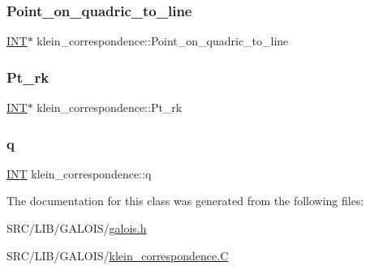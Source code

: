 \mbox{\label{classklein__correspondence_af43585c748a59d2c758ce9a37908e90e}} 
\subsubsection{\texorpdfstring{Point\+\_\+on\+\_\+quadric\+\_\+to\+\_\+line}{Point\_on\_quadric\_to\_line}}
{\footnotesize\ttfamily \mbox{\hyperlink{galois_8h_a09fddde158a3a20bd2dcadb609de11dc}{I\+NT}}$\ast$ klein\+\_\+correspondence\+::\+Point\+\_\+on\+\_\+quadric\+\_\+to\+\_\+line}

\mbox{\label{classklein__correspondence_acdbdfeee52911091a16f31c8e24f7ab4}} 
\subsubsection{\texorpdfstring{Pt\+\_\+rk}{Pt\_rk}}
{\footnotesize\ttfamily \mbox{\hyperlink{galois_8h_a09fddde158a3a20bd2dcadb609de11dc}{I\+NT}}$\ast$ klein\+\_\+correspondence\+::\+Pt\+\_\+rk}

\mbox{\label{classklein__correspondence_af8e70a706ee72d93b14a4ed91774df78}} 
\subsubsection{\texorpdfstring{q}{q}}
{\footnotesize\ttfamily \mbox{\hyperlink{galois_8h_a09fddde158a3a20bd2dcadb609de11dc}{I\+NT}} klein\+\_\+correspondence\+::q}



The documentation for this class was generated from the following files\+:\begin{DoxyCompactItemize}
\item 
S\+R\+C/\+L\+I\+B/\+G\+A\+L\+O\+I\+S/\mbox{\hyperlink{galois_8h}{galois.\+h}}\item 
S\+R\+C/\+L\+I\+B/\+G\+A\+L\+O\+I\+S/\mbox{\hyperlink{klein__correspondence_8_c}{klein\+\_\+correspondence.\+C}}\end{DoxyCompactItemize}
